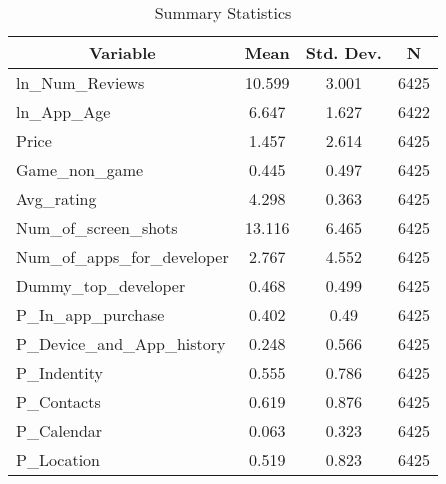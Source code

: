 \documentclass[12pt]{article}
\begin{document}
\begin{table}[ht]\centering \caption{Summary Statistics \label{sumstat}}
	\begin{tabular}{l c c  c}\hline\hline
		\multicolumn{1}{c}{\textbf{Variable}} & \textbf{Mean}
		& \textbf{Std. Dev.} & \textbf{N}\\ \hline
		ln\_Num\_Reviews &  10.599 & 3.001  & 6425\\ \hline\hline
		ln\_App\_Age & 6.647 & 1.627  & 6422\\
		Price & 1.457 & 2.614  & 6425\\
		Game\_non\_game &  0.445 & 0.497  & 6425\\
		Avg\_rating &  4.298 & 0.363  & 6425\\
		Num\_of\_screen\_shots & 13.116 & 6.465  & 6425\\ \hline\hline
		Num\_of\_apps\_for\_developer &  2.767 & 4.552  & 6425\\
		Dummy\_top\_developer & 0.468 & 0.499  & 6425\\ \hline\hline
		P\_In\_app\_purchase &  0.402 & 0.49  & 6425\\
		P\_Device\_and\_App\_history &  0.248 & 0.566  & 6425\\
		P\_Indentity &  0.555 & 0.786  & 6425\\
		P\_Contacts & 0.619 & 0.876  & 6425\\
		P\_Calendar & 0.063 & 0.323  & 6425\\
		P\_Location &  0.519 & 0.823  & 6425\\

\end{tabular}
\end{table}
\end{document}
